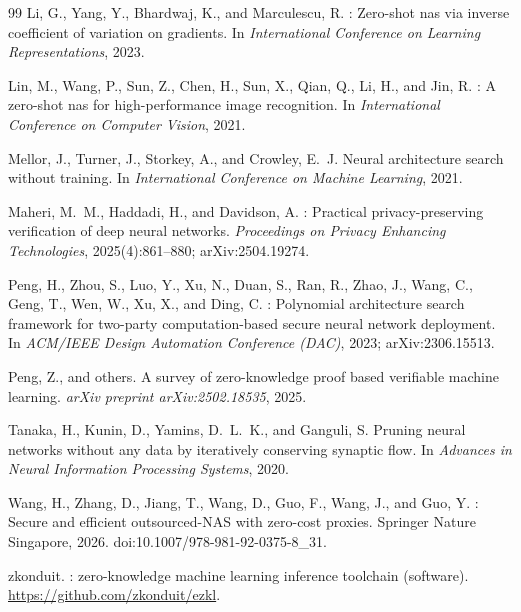 \documentclass[10pt]{article}
\begin{document}
\begin{thebibliography}{99}
Li, G., Yang, Y., Bhardwaj, K., and Marculescu, R.
: Zero-shot nas via inverse coefficient of variation on
  gradients.
\newblock In \emph{International Conference on Learning Representations}, 2023.

Lin, M., Wang, P., Sun, Z., Chen, H., Sun, X., Qian, Q., Li, H., and Jin, R.
: A zero-shot nas for high-performance image recognition.
\newblock In \emph{International Conference on Computer Vision}, 2021.

Mellor, J., Turner, J., Storkey, A., and Crowley, E.~J.
\newblock Neural architecture search without training.
\newblock In \emph{International Conference on Machine Learning}, 2021.

Maheri, M.~M., Haddadi, H., and Davidson, A.
: Practical privacy-preserving verification of deep
  neural networks.
\newblock \emph{Proceedings on Privacy Enhancing Technologies}, 2025(4):861--880;
  arXiv:2504.19274.

Peng, H., Zhou, S., Luo, Y., Xu, N., Duan, S., Ran, R., Zhao, J., Wang, C., Geng,
  T., Wen, W., Xu, X., and Ding, C.
: Polynomial architecture search framework for two-party
  computation-based secure neural network deployment.
\newblock In \emph{ACM/IEEE Design Automation Conference (DAC)}, 2023;
  arXiv:2306.15513.

Peng, Z., and others.
\newblock A survey of zero-knowledge proof based verifiable machine learning.
\newblock \emph{arXiv preprint arXiv:2502.18535}, 2025.

Tanaka, H., Kunin, D., Yamins, D.~L.~K., and Ganguli, S.
\newblock Pruning neural networks without any data by iteratively conserving
  synaptic flow.
\newblock In \emph{Advances in Neural Information Processing Systems}, 2020.

Wang, H., Zhang, D., Jiang, T., Wang, D., Guo, F., Wang, J., and Guo, Y.
: Secure and efficient outsourced-{NAS} with zero-cost proxies.
\newblock Springer Nature Singapore, 2026.
  doi:10.1007/978-981-92-0375-8\_31.

zkonduit.
: zero-knowledge machine learning inference toolchain
  (software).
\newblock \url{https://github.com/zkonduit/ezkl}.

\end{thebibliography}
\end{document}
